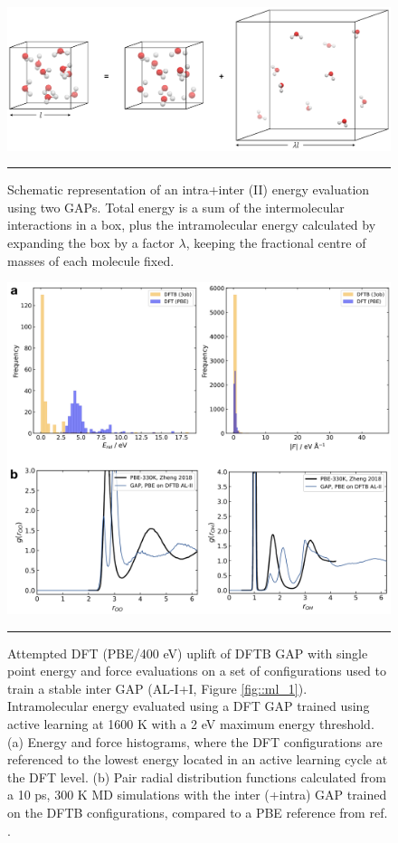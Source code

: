 \documentclass[../../main.tex]{subfiles}
\begin{document}
\begin{figure}[h!]
	\vspace{0.4cm}
	\centering
	\includegraphics[width=\textwidth]{6/gap/figs_si/fig10}
	\vspace{0.2cm}
	\hrule
	\caption{Schematic representation of an intra+inter (II) energy evaluation using two GAPs. Total energy is a sum of the intermolecular interactions in a box, plus the intramolecular energy calculated by expanding the box by a factor $\lambda$, keeping the fractional centre of masses of each molecule fixed.}
	\label{fig::ml_si_10}
\end{figure}



\begin{figure}[h!]
	\vspace{0.4cm}
	\centering
	\includegraphics[width=\textwidth]{6/gap/figs_si/fig11}
	\vspace{0.2cm}
	\hrule
	\caption{Attempted DFT (PBE/400 eV) uplift of DFTB GAP with single point energy and force evaluations on a set of configurations used to train a stable inter GAP (AL-I+I, Figure \ref{fig::ml_1}). Intramolecular energy evaluated using a DFT GAP trained using active learning at 1600 K with a 2 eV maximum energy threshold. (a) Energy and force histograms, where the DFT configurations are referenced to the lowest energy located in an active learning cycle at the DFT level. (b) Pair radial distribution functions calculated from a 10 ps, 300 K MD simulations with the inter (+intra) GAP trained on the DFTB configurations, compared to a PBE reference from ref. \cite{Zheng2018}.}
	\label{fig::ml_si_11}
\end{figure}
\end{document}
